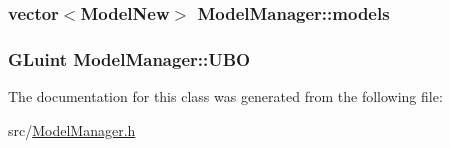 \subsubsection[{\texorpdfstring{models}{models}}]{\setlength{\rightskip}{0pt plus 5cm}vector$<${\bf Model\+New}$>$ Model\+Manager\+::models\hspace{0.3cm}{\ttfamily [protected]}}\hypertarget{class_model_manager_a66b312e1eed8fae4aab899135ea810bd}{}\label{class_model_manager_a66b312e1eed8fae4aab899135ea810bd}
\subsubsection[{\texorpdfstring{U\+BO}{UBO}}]{\setlength{\rightskip}{0pt plus 5cm}G\+Luint Model\+Manager\+::\+U\+BO\hspace{0.3cm}{\ttfamily [protected]}}\hypertarget{class_model_manager_afe939e70ae80fdb5374ee838296d70c3}{}\label{class_model_manager_afe939e70ae80fdb5374ee838296d70c3}


The documentation for this class was generated from the following file\+:\begin{DoxyCompactItemize}
\item 
src/\hyperlink{_model_manager_8h}{Model\+Manager.\+h}\end{DoxyCompactItemize}
